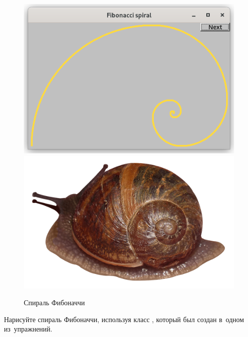 \begin{exercise}
\begin{figure}[ht]
    {\centering
        \includegraphics[height=0.25\textwidth]{images/fibonacci_spiral_draw.png}
        \hspace{1.5cm}
        \includegraphics[height=0.25\textwidth]{images/snail.png}

    }
    \caption{Спираль Фибоначчи}
    \label{fig:fibonaccispiral}
\end{figure}

Нарисуйте спираль Фибоначчи, используя класс , который был создан в~одном из~упражнений.
\end{exercise}
